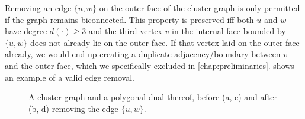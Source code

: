 Removing an edge $\{u,w\}$ on the outer face of the cluster graph is only permitted if the graph remains biconnected.
This property is preserved iff both $u$ and $w$ have degree $d(\cdot) \geq 3$ and the third vertex $v$ in the internal face bounded by $\{u,w\}$ does not already lie on the outer face.
If that vertex laid on the outer face already, we would end up creating a duplicate adjacency/boundary between $v$ and the outer face, which we specifically excluded in \cref{chap:preliminaries}.
 shows an example of a valid edge removal.

\begin{figure}[H]
	\centering
	\quad
	\qquad
	\quad
	\caption{A cluster graph and a polygonal dual thereof, before (a, c) and after (b, d) removing the edge $\{u,w\}$.}
	\label{fig:flip-edge-example-remove}
\end{figure}


